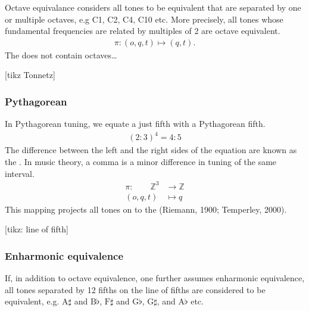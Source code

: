 \documentclass[letterpaper,10pt,english]{sphinxmanual}
\begin{document}
Octave equivalance considers all tones to be equivalent that are separated by one or
multiple octaves, e.g C1, C2, C4, C10 etc. More precisely, all tones whose fundamental frequencies
are related by multiples of 2 are octave equivalent.
\begin{equation*}
\begin{split}\pi: (o, q, t) \mapsto (q, t).\end{split}
\end{equation*}
The  does not contain octaves…

{[}tikz Tonnetz{]}


\subsubsection{Pythagorean}
\label{\detokenize{2_fundamentals1:pythagorean}}
In Pythagorean tuning, we equate a just fifth with a Pythagorean fifth.
\begin{equation*}
\begin{split}(2:3)^4 = 4:5\end{split}
\end{equation*}
The difference between the left and the right sides of the equation
are known as the . In music theory, a comma is a
minor difference in tuning of the same interval.
\begin{equation*}
\begin{split}\pi: \qquad \mathbb{Z}^3 &\rightarrow \mathbb{Z} \\
(o, q, t) &\mapsto q\end{split}
\end{equation*}
This mapping projects all tones on to the  (Riemann, 1900; Temperley, 2000).

{[}tikz: line of fifth{]}


\subsubsection{Enharmonic equivalence}
\label{\detokenize{2_fundamentals1:enharmonic-equivalence}}
If, in addition to octave equivalence, one further assumes enharmonic equivalence,
all tones separated by 12 fifths on the line of fifths
are considered to be equivalent, e.g. \(\text{A}\sharp\) and \(\text{B}\flat\),
\(\text{F}\sharp\) and \(\text{G}\flat\), \(\text{G}\sharp\), and \(\text{A}\flat\) etc.
\end{document}
